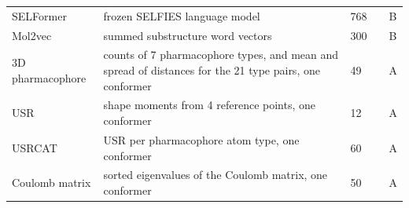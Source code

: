 \begin{longtable}{P{3.0cm}P{5.0cm}P{1.5cm}P{1.5cm}P{1.4cm}}
SELFormer & frozen SELFIES language model & 768 & \citep{Yuksel2023} & B \\
Mol2vec & summed substructure word vectors & 300 & \citep{Jaeger2018} & B \\
3D pharmacophore & counts of 7 pharmacophore types, and mean and spread of distances for the 21 type pairs, one conformer & 49 & \citep{rdkit} & A \\
USR & shape moments from 4 reference points, one conformer & 12 & \citep{Ballester2007} & A \\
USRCAT & USR per pharmacophore atom type, one conformer & 60 & \citep{Schreyer2012} & A \\
Coulomb matrix & sorted eigenvalues of the Coulomb matrix, one conformer & 50 & \citep{Rupp2012} & A \\
\end{longtable}

